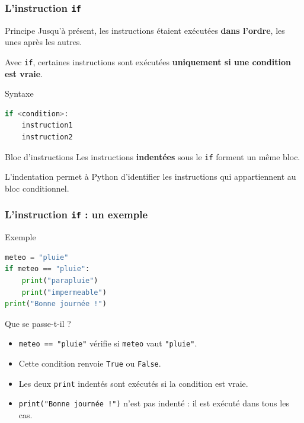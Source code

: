 \documentclass[10pt]{beamer}
\begin{document}
\begin{frame}[containsverbatim]
	\frametitle{L'instruction \texttt{if}}
	
	\begin{block}{Principe}
		Jusqu'à présent, les instructions étaient exécutées
		\textbf{dans l'ordre}, les unes après les autres.
		
		\vspace{0.1cm}
		
		Avec \texttt{if}, certaines instructions sont exécutées
		\textbf{uniquement si une condition est vraie}.
	\end{block}
	
	\vspace{0.25cm}
	
\begin{alertblock}{Syntaxe}
\begin{lstlisting}[language=Python]
if <condition>:
	instruction1
	instruction2
\end{lstlisting}
\end{alertblock}
	
	\vspace{0.15cm}
	
	\begin{exampleblock}{Bloc d'instructions}
		Les instructions \textbf{indentées} sous le \texttt{if}
		forment un même bloc.
		
		\vspace{0.1cm}
		
		L'indentation permet à Python d'identifier les instructions
		qui appartiennent au bloc conditionnel.
	\end{exampleblock}
	
\end{frame}


\begin{frame}[containsverbatim]
	\frametitle{L'instruction \texttt{if} : un exemple}
	
	
\begin{exampleblock}{Exemple}
\begin{lstlisting}[language=Python]
meteo = "pluie"
if meteo == "pluie":
	print("parapluie")
	print("impermeable")
print("Bonne journée !")
\end{lstlisting}
\end{exampleblock}

	
	\vspace{0.15cm}
	
	\begin{block}{Que se passe-t-il ?}
		\begin{itemize}
			\item \texttt{meteo == "pluie"} vérifie si \texttt{meteo} vaut \texttt{"pluie"}.
			\item Cette condition renvoie \texttt{True} ou \texttt{False}.
			\item Les deux \texttt{print} indentés sont exécutés si la condition est vraie.
			\item \texttt{print("Bonne journée !")} n'est pas indenté : il est exécuté dans tous les cas.
		\end{itemize}
	\end{block}
	
	
\end{frame}
\end{document}
